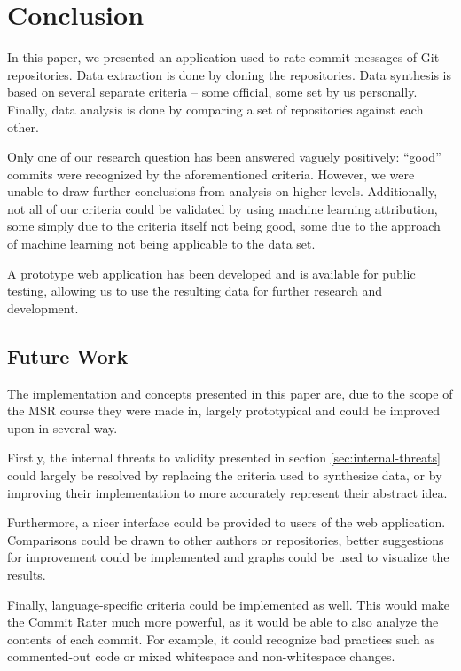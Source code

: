 \section{Conclusion}
\label{sec:conclusion}


In this paper, we presented an application used to rate commit messages of Git repositories. Data extraction is done by cloning the repositories. Data synthesis is based on several separate criteria -- some official, some set by us personally. Finally, data analysis is done by comparing a set of repositories against each other.

Only one of our research question has been answered vaguely positively: ``good'' commits were recognized by the aforementioned criteria. However, we were unable to draw further conclusions from analysis on higher levels. Additionally, not all of our criteria could be validated by using machine learning attribution, some simply due to the criteria itself not being good, some due to the approach of machine learning not being applicable to the data set.

A prototype web application has been developed and is available for public testing, allowing us to use the resulting data for further research and development.


\subsection{Future Work}
\label{sec:future-work}

The implementation and concepts presented in this paper are, due to the scope of the MSR course they were made in, largely prototypical and could be improved upon in several way.

Firstly, the internal threats to validity presented in section \ref{sec:internal-threats} could largely be resolved by replacing the criteria used to synthesize data, or by improving their implementation to more accurately represent their abstract idea.

Furthermore, a nicer interface could be provided to users of the web application. Comparisons could be drawn to other authors or repositories, better suggestions for improvement could be implemented and graphs could be used to visualize the results.

Finally, language-specific criteria could be implemented as well. This would make the Commit Rater much more powerful, as it would be able to also analyze the contents of each commit. For example, it could recognize bad practices such as commented-out code or mixed whitespace and non-whitespace changes.

